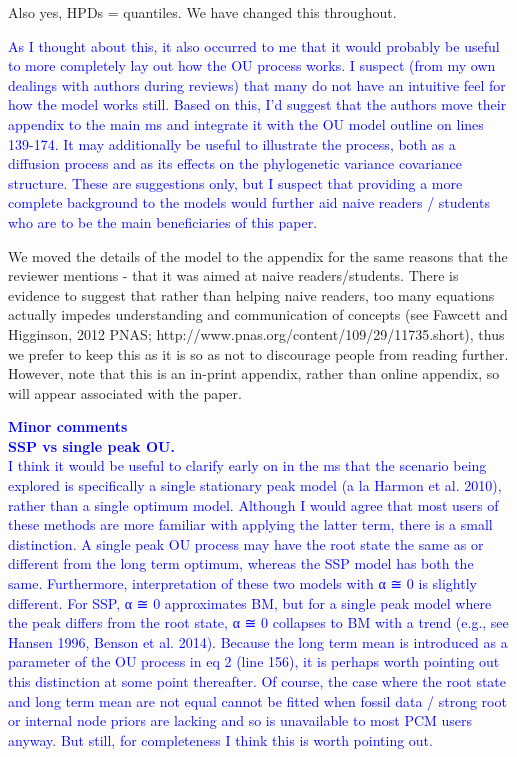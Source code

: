 \documentclass[12pt]{letter}
\begin{document}
\begin{letter}{}
Also yes, HPDs = quantiles. We have changed this throughout.


\textcolor{blue}{As I thought about this, it also occurred to me that it would probably be useful to more completely lay out how the OU process works. I suspect (from my own dealings with authors during reviews) that many do not have an intuitive feel for how the model works still. Based on this, I'd suggest that the authors move their appendix to the main ms and integrate it with the OU model outline on lines 139-174. It may additionally be useful to illustrate the process, both as a diffusion process and as its effects on the phylogenetic variance covariance structure. These are suggestions only, but I suspect that providing a more complete background to the models would further aid naive readers / students who are to be the main beneficiaries of this paper.}

We moved the details of the model to the appendix for the same reasons that the reviewer mentions - that it was aimed at naive readers/students. There is evidence to suggest that rather than helping naive readers, too many equations actually impedes understanding and communication of concepts (see Fawcett and Higginson, 2012 PNAS; http://www.pnas.org/content/109/29/11735.short), thus we prefer to keep this as it is so as not to discourage people from reading further. However, note that this is an in-print appendix, rather than online appendix, so will appear associated with the paper.


\textcolor{blue}{\textbf{Minor comments}\\
\textbf{SSP vs single peak OU.}\\
I think it would be useful to clarify early on in the ms that the scenario being explored is specifically a single stationary peak model (a la Harmon et al. 2010), rather than a single optimum model. Although I would agree that most users of these methods are more familiar with applying the latter term, there is a small distinction. A single peak OU process may have the root state the same as or different from the long term optimum, whereas the SSP model has both the same. Furthermore, interpretation of these two models with α ≅ 0 is slightly different. For SSP, α ≅ 0 approximates BM, but for a single peak model where the peak differs from the root state, α ≅ 0 collapses to BM with a trend (e.g., see Hansen 1996, Benson et al. 2014). Because the long term mean is introduced as a parameter of the OU process in eq 2 (line 156), it is perhaps worth pointing out this distinction at some point thereafter. Of course, the case where the root state and long term mean are not equal cannot be fitted when fossil data / strong root or internal node priors are lacking and so is unavailable to most PCM users anyway. But still, for completeness I think this is worth pointing out.}


\end{letter}
\end{document}
